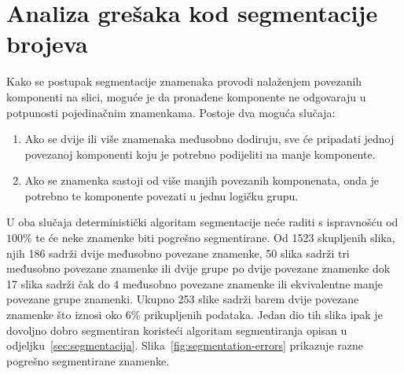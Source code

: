 \section{Analiza grešaka kod segmentacije brojeva}
Kako se postupak segmentacije znamenaka provodi nalaženjem povezanih komponenti na slici, moguće je da pronađene
komponente ne odgovaraju u potpunosti pojedinačnim znamenkama. Postoje dva moguća slučaja:
\begin{enumerate}
    \item Ako se dvije ili više znamenaka međusobno dodiruju, sve će pripadati jednoj povezanoj komponenti koju je
    potrebno podijeliti na manje komponente.
    \item Ako se znamenka sastoji od više manjih povezanih komponenata, onda je potrebno te komponente povezati u jednu
    logičku grupu.
\end{enumerate}
U oba slučaja deterministički algoritam segmentacije neće raditi s  ispravnošću od $100\%$ te će neke znamenke biti
pogrešno segmentirane. Od 1523 skupljenih slika, njih 186 sadrži dvije međusobno povezane znamenke, 50 slika sadrži tri
međusobno povezane znamenke ili dvije grupe po dvije povezane znamenke dok 17 slika sadrži čak do 4 međusobno povezane
znamenke ili ekvivalentne manje povezane grupe znamenki. Ukupno 253 slike sadrži barem dvije povezane znamenke što
iznosi oko $6\%$ prikupljenih podataka. Jedan dio tih slika ipak je dovoljno dobro segmentiran koristeći algoritam
segmentiranja opisan u odjeljku\ \ref{sec:segmentacija}. Slika\ \ref{fig:segmentation-errors} prikazuje razne pogrešno
segmentirane znamenke.
